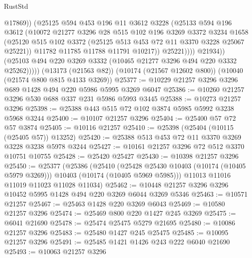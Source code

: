 \begin{lexlean}{RustStd}
\begin{coremodule}
                        @17869))
                    (@25125
                      @594
                      @453
                      @196
                      @11
                      @3612
                      @3228
                      (@25133
                        @594
                        @196
                        @3612
                        (@10072
                          @21277
                          @3296
                          @28
                          @515
                          @102
                          @196
                          @3269
                          @3372
                          @3234
                          @1658
                          (@25120
                            @515
                            @102
                            @3372
                            (@25125 @513 @453 @72 @11 @3370 @3228 @25067 @25221))
                          @11782
                          @11785
                          @11788
                          @11791
                          @10217))
                      @25221))))
              @21934))
          (@25103 @494 @220 @3269 @3332 (@10465 @21277 @3296 @494 @220 @3332 @25262)))))
    (@13173 (@21563 @82))
    (@10174 (@21567 @12602 @800))
    (@10040 (@21574 @800 @815 @4133 @3269))
@25377 := @10229 @21257 @3296 @3296 @689 @1428 @494 @220 @5986 @5995 @3269 @6047
@25386 := @10260 @21257 @3296 @530 @688 @337 @231 @5986 @5993 @3445
@25388 := @10273 @21257 @3296
@25398 := @25388 @443 @515 @72 @102 @3874 @5985 @5992 @3238 @5968 @3244
@25400 := @10107 @21257 @3296
@25404 := @25400 @57 @72 @57 @3874
@25405 := @10116 @21257
@25410 := @25398 (@25404 (@10115 (@25405 @57)) @13252)
@25420 := @25388 @513 @453 @72 @11 @3370 @3269 @3228 @3238 @5978 @3244
@25427 := @10161 @21257 @3296 @72 @512 @3370 @10751 @10755
@25428 := @25420 @25427
@25430 := @10398 @21257 @3296
@25450 := @25377
    (@25386
      (@25410
        (@25428 @25430 @10403 (@10174 (@10405 @5979 @3269)))
        @10403
        (@10174 (@10405 @5969 @5985)))
      @11013
      @11016
      @11019
      @11023
      @11028
      @11034)
@25462 := @10448 @21257 @3296 @3296 @10452 @5995 @1428 @494 @220 @3269 @6044 @3269 @5346
@25463 := @10571 @21257
@25467 := @25463 @1428 @220 @3269 @6043
@25469 := @10580 @21257 @3296
@25474 := @25469 @800 @220 @1427 @245 @3269
@25475 := @6041 @21690
@25478 := @25474 @25475 @5279 @21695
@25480 := @10086 @21257 @3296
@25483 := @25480 @1427 @245 @25475
@25485 := @10095 @21257 @3296
@25491 := @25485 @1421 @1426 @243 @222 @6040 @21690
@25493 := @10063 @21257 @3296

\end{coremodule}
\end{lexlean}
